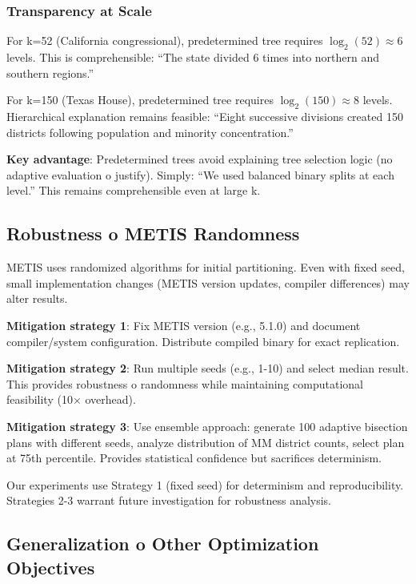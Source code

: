 \subsubsection{Transparency at Scale}

For k=52 (California congressional), predetermined tree requires $\log_2(52) \approx 6$ levels. This is comprehensible: ``The state divided 6 times into northern and southern regions.''

For k=150 (Texas House), predetermined tree requires $\log_2(150) \approx 8$ levels. Hierarchical explanation remains feasible: ``Eight successive divisions created 150 districts following population and minority concentration.''

\textbf{Key advantage}: Predetermined trees avoid explaining tree selection logic (no adaptive evaluation 	o justify). Simply: ``We used balanced binary splits at each level.'' This remains comprehensible even at large k.

\subsection{Robustness 	o METIS Randomness}

METIS uses randomized algorithms for initial partitioning. Even with fixed seed, small implementation changes (METIS version updates, compiler differences) may alter results.

\textbf{Mitigation strategy 1}: Fix METIS version (e.g., 5.1.0) and document compiler/system configuration. Distribute compiled binary for exact replication.

\textbf{Mitigation strategy 2}: Run multiple seeds (e.g., 1-10) and select median result. This provides robustness 	o randomness while maintaining computational feasibility (10× overhead).

\textbf{Mitigation strategy 3}: Use ensemble approach: generate 100 adaptive bisection plans with different seeds, analyze distribution of MM district counts, select plan at 75th percentile. Provides statistical confidence but sacrifices determinism.

Our experiments use Strategy 1 (fixed seed) for determinism and reproducibility. Strategies 2-3 warrant future investigation for robustness analysis.

\subsection{Generalization 	o Other Optimization Objectives}

